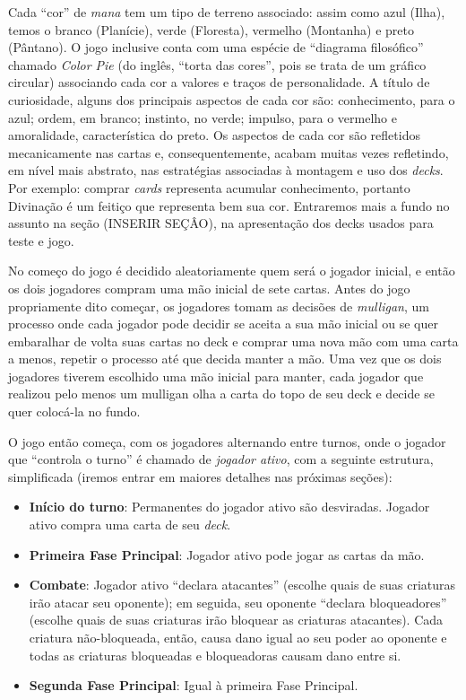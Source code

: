 \documentclass{book}
\begin{document}
Cada ``cor'' de \textit{mana} tem um tipo de terreno associado: assim como azul (Ilha), temos o branco (Planície), verde (Floresta),
vermelho (Montanha) e preto (Pântano). O jogo inclusive conta com uma espécie de ``diagrama filosófico'' chamado \textit{Color Pie}
(do inglês, ``torta das cores'', pois se trata de um gráfico circular) associando cada cor a valores e traços de personalidade.
A título de curiosidade, alguns dos principais aspectos de cada cor são: conhecimento, para o azul; ordem, em branco; instinto, no verde;
impulso, para o vermelho e amoralidade, característica do preto. Os aspectos de cada cor são refletidos mecanicamente nas cartas e,
consequentemente, acabam muitas vezes refletindo, em nível mais abstrato, nas estratégias associadas à montagem e uso dos \textit{decks}.
Por exemplo: comprar \textit{cards} representa acumular conhecimento, portanto Divinação é um feitiço que representa bem sua cor.
Entraremos mais a fundo no assunto na seção (INSERIR SEÇÂO), na apresentação dos decks usados para teste e jogo.

No começo do jogo é decidido aleatoriamente quem será o jogador inicial, e então os dois jogadores compram uma mão inicial de sete cartas.
Antes do jogo propriamente dito começar, os jogadores tomam as decisões de \textit{mulligan}, um processo onde cada jogador pode decidir
se aceita a sua mão inicial ou se quer embaralhar de volta suas cartas no deck e comprar uma nova mão com uma carta a menos, repetir o processo
até que decida manter a mão. Uma vez que os dois jogadores tiverem escolhido uma mão inicial para manter, cada jogador que realizou pelo menos um mulligan
olha a carta do topo de seu deck e decide se quer colocá-la no fundo.

O jogo então começa, com os jogadores alternando entre turnos, onde o jogador que ``controla o turno'' é chamado de \textit{jogador ativo}, com a seguinte estrutura, simplificada (iremos entrar em maiores detalhes nas próximas seções):

\begin{itemize}
    \item\textbf{Início do turno}: Permanentes do jogador ativo são desviradas. Jogador ativo compra uma carta de seu \textit{deck}.
    \item\textbf{Primeira Fase Principal}: Jogador ativo pode jogar as cartas da mão.
    \item \textbf{Combate}: Jogador ativo ``declara atacantes'' (escolhe quais de suas criaturas irão atacar seu oponente); em seguida, seu oponente ``declara bloqueadores'' (escolhe quais de suas criaturas irão bloquear as criaturas atacantes). Cada criatura não-bloqueada, então, causa dano igual ao seu poder ao oponente e todas as criaturas bloqueadas e bloqueadoras causam dano entre si.
    \item \textbf{Segunda Fase Principal}: Igual à primeira Fase Principal.
\end{itemize}
\end{document}
